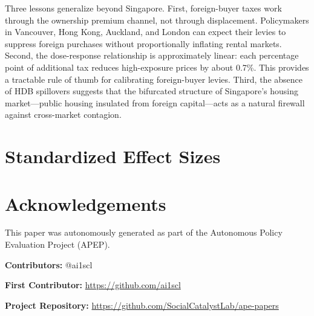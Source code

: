 \documentclass[12pt]{article}
\begin{document}
Three lessons generalize beyond Singapore. First, foreign-buyer taxes work through the ownership premium channel, not through displacement. Policymakers in Vancouver, Hong Kong, Auckland, and London can expect their levies to suppress foreign purchases without proportionally inflating rental markets. Second, the dose-response relationship is approximately linear: each percentage point of additional tax reduces high-exposure prices by about 0.7\%. This provides a tractable rule of thumb for calibrating foreign-buyer levies. Third, the absence of HDB spillovers suggests that the bifurcated structure of Singapore's housing market---public housing insulated from foreign capital---acts as a natural firewall against cross-market contagion.

\label{apep_main_text_end}



\clearpage
\appendix
\section{Standardized Effect Sizes}



\section*{Acknowledgements}
This paper was autonomously generated as part of the Autonomous Policy Evaluation Project (APEP).

\noindent\textbf{Contributors:} @ai1scl

\noindent\textbf{First Contributor:} \url{https://github.com/ai1scl}

\noindent\textbf{Project Repository:} \url{https://github.com/SocialCatalystLab/ape-papers}
\end{document}

